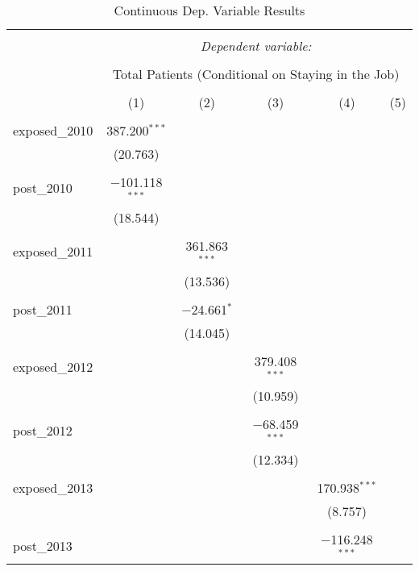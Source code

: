 
\begin{table}[!htbp] \centering 
  \caption{Continuous Dep. Variable Results} 
  \label{} 
  \begin{adjustbox}{width=\textwidth}
\begin{tabular}{@{\extracolsep{5pt}}lccccc} 
\\[-1.8ex]\hline 
\hline \\[-1.8ex] 
 & \multicolumn{5}{c}{\textit{Dependent variable:}} \\ 
\cline{2-6} 
\\[-1.8ex] & \multicolumn{5}{c}{Total Patients (Conditional on Staying in the Job)} \\ 
\\[-1.8ex] & (1) & (2) & (3) & (4) & (5)\\ 
\hline \\[-1.8ex] 
 exposed\_2010 & 387.200$^{***}$ &  &  &  &  \\ 
  & (20.763) &  &  &  &  \\ 
  & & & & & \\ 
 post\_2010 & $-$101.118$^{***}$ &  &  &  &  \\ 
  & (18.544) &  &  &  &  \\ 
  & & & & & \\ 
 exposed\_2011 &  & 361.863$^{***}$ &  &  &  \\ 
  &  & (13.536) &  &  &  \\ 
  & & & & & \\ 
 post\_2011 &  & $-$24.661$^{*}$ &  &  &  \\ 
  &  & (14.045) &  &  &  \\ 
  & & & & & \\ 
 exposed\_2012 &  &  & 379.408$^{***}$ &  &  \\ 
  &  &  & (10.959) &  &  \\ 
  & & & & & \\ 
 post\_2012 &  &  & $-$68.459$^{***}$ &  &  \\ 
  &  &  & (12.334) &  &  \\ 
  & & & & & \\ 
 exposed\_2013 &  &  &  & 170.938$^{***}$ &  \\ 
  &  &  &  & (8.757) &  \\ 
  & & & & & \\ 
 post\_2013 &  &  &  & $-$116.248$^{***}$ &  \\ 

\end{tabular}
\end{adjustbox}
\end{table}
